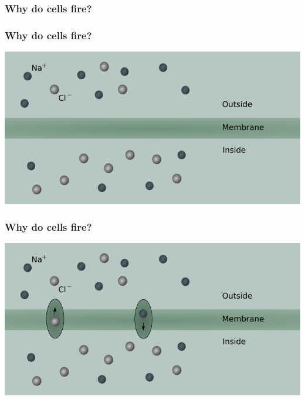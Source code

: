 \documentclass[norsk, 12pt]{beamer}
\begin{document}
\begin{frame}[fragile]
\frametitle{Why do cells fire?}
\end{frame}


\begin{frame}[fragile]
\frametitle{Why do cells fire?}
\begin{center}
	\includegraphics[width=\textwidth]{HH0}
\end{center}
\end{frame}

\begin{frame}[fragile]
\frametitle{Why do cells fire?}
\begin{center}
	\includegraphics[width=\textwidth]{HH1}
\end{center}
\end{frame}
\end{document}
